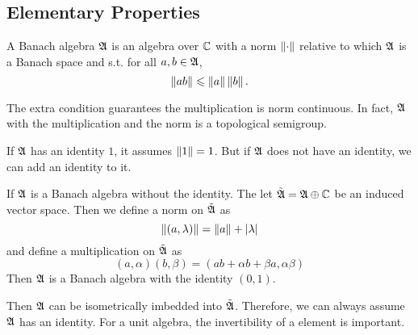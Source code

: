 \documentclass[a4paper,11pt]{report}
\begin{document}
\subsection{Elementary Properties}

\begin{defn}
	A Banach algebra $\mathfrak{A}$ is an algebra over $\mathbb{C}$ with a norm $\left\lVert\cdot\right\lVert$ relative to which $\mathfrak{A}$ is a Banach space and s.t. for all $a,b \in \mathfrak{A}$,
	\begin{equation*}
		\left\lVert ab\right\lVert \leqslant \left\lVert a\right\lVert\left\lVert b\right\lVert.
	\end{equation*}
\end{defn}
\begin{rem}
	The extra condition guarantees the multiplication is norm continuous. In fact, $\mathfrak{A}$ with the multiplication and the norm is a topological semigroup.
\end{rem}

If $\mathfrak{A}$ has an identity $1$, it assumes $\left\lVert1\right\lVert=1$. But if $\mathfrak{A}$ does not have an identity, we can add an identity to it.

\begin{prop}
	If $\mathfrak{A}$ is a Banach algebra without the identity. The let $\tilde{\mathfrak{A}}= \mathfrak{A} \oplus \mathbb{C}$ be an induced vector space. Then we define a norm on $\tilde{\mathfrak{A}}$ as
	\begin{equation*}
		\left\lVert(a,\lambda)\right\lVert = \left\lVert a\right\lVert + \left\lvert\lambda\right\lvert
	\end{equation*}
	and define a multiplication on $\tilde{\mathfrak{A}}$ as
	\begin{equation*}
		(a,\alpha)(b,\beta) = (ab+\alpha b + \beta a, \alpha \beta)
	\end{equation*}
	Then $\mathfrak{A}$ is a Banach algebra with the identity $(0,1)$.
\end{prop}

Then $\mathfrak{A}$ can be isometrically imbedded into $\tilde{\mathfrak{A}}$. Therefore, we can always assume $\mathfrak{A}$ has an identity. For a unit algebra, the invertibility of a element is important. 
\end{document}
